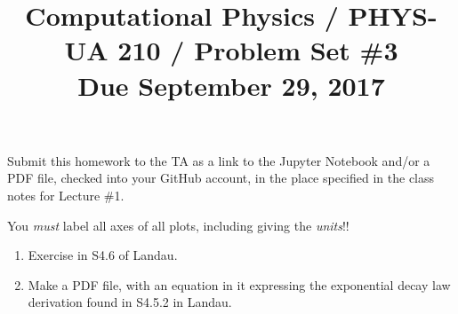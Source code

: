 \documentclass[11pt, preprint]{aastex}
\begin{document}
\title{\bf Computational Physics / PHYS-UA 210 / Problem Set \#3
\\ Due September 29, 2017 }

Submit this homework to the TA as a link to the Jupyter Notebook
and/or a PDF file, checked into your GitHub account, in the place
specified in the class notes for Lecture \#1.

You {\it must} label all axes of all plots, including giving the {\it
  units}!!

\begin{enumerate}

  \item Exercise in S4.6 of Landau.

  \item Make a PDF file, with an equation in it expressing the
    exponential decay law derivation found in S4.5.2 in Landau.

\end{enumerate}
\end{document}
